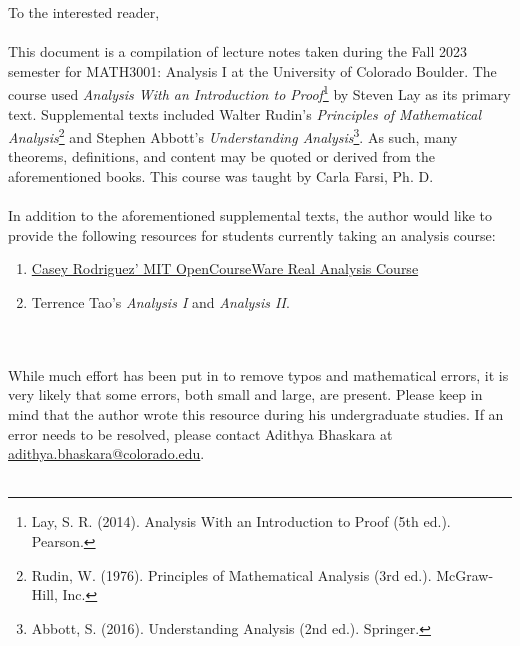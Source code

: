 To the interested reader,
\\
\\
This document is a compilation of lecture notes taken during the Fall 2023 semester for MATH3001: Analysis I at the University of Colorado Boulder. The course used \textit{Analysis With an Introduction to Proof}\footnote{Lay, S. R. (2014). Analysis With an Introduction to Proof (5th ed.). Pearson.} by Steven Lay as its primary text. Supplemental texts included Walter Rudin's \textit{Principles of Mathematical Analysis}\footnote{Rudin, W. (1976). Principles of Mathematical Analysis (3rd ed.). McGraw-Hill, Inc.} and Stephen Abbott's \textit{Understanding Analysis}\footnote{Abbott, S. (2016). Understanding Analysis (2nd ed.). Springer.}. As such, many theorems, definitions, and content may be quoted or derived from the aforementioned books. This course was taught by Carla Farsi, Ph. D.
\\
\\
In addition to the aforementioned supplemental texts, the author would like to provide the following resources for students currently taking an analysis course:
\begin{enumerate}
    \item \href{https://ocw.mit.edu/courses/18-100a-real-analysis-fall-2020/}{Casey Rodriguez' MIT OpenCourseWare Real Analysis Course}
    \item Terrence Tao's \textit{Analysis I} and \textit{Analysis II}.
\end{enumerate}
\vphantom
\\
\\
While much effort has been put in to remove typos and mathematical errors, it is very likely that some errors, both small and large, are present. Please keep in mind that the author wrote this resource during his undergraduate studies. If an error needs to be resolved, please contact Adithya Bhaskara at \href{mailto:adithya.bhaskara@colorado.edu}{adithya.bhaskara@colorado.edu}.
\\
\\
\vfill
{}